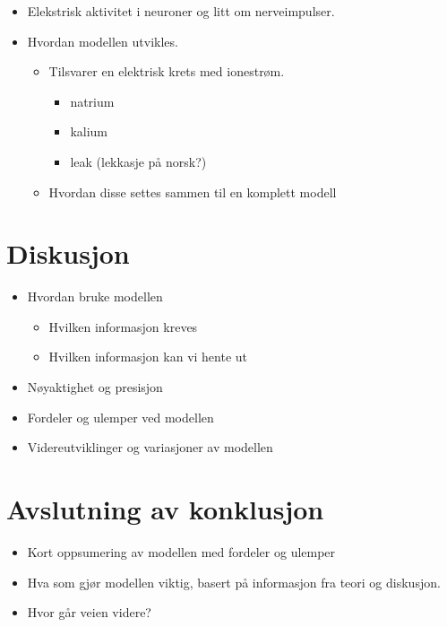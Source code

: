\documentclass[a4paper,norsk,12pt,oneside]{article}
\begin{document}
\begin{itemize}

    \item Elekstrisk aktivitet i neuroner og litt om nerveimpulser. 

    \item Hvordan modellen utvikles.

        \begin{itemize}

            \item Tilsvarer en elektrisk krets med ionestrøm. 

                \begin{itemize}

                    \item natrium  

                    \item kalium 

                    \item leak (lekkasje på norsk?)
                \end{itemize}

            \item Hvordan disse settes sammen til en komplett modell

        \end{itemize}

\end{itemize}

\section*{Diskusjon}

\begin{itemize}

    \item Hvordan bruke modellen

        \begin{itemize}

            \item Hvilken informasjon kreves

            \item Hvilken informasjon kan vi hente ut

        \end{itemize}

    \item Nøyaktighet og presisjon

    \item Fordeler og ulemper ved modellen

    \item Videreutviklinger og variasjoner av modellen

\end{itemize}

\section*{Avslutning av konklusjon}

\begin{itemize}

    \item Kort oppsumering av modellen med fordeler og ulemper

    \item Hva som gjør modellen viktig, basert på informasjon fra teori og diskusjon. 

    \item Hvor går veien videre?

\end{itemize}
\end{document}
